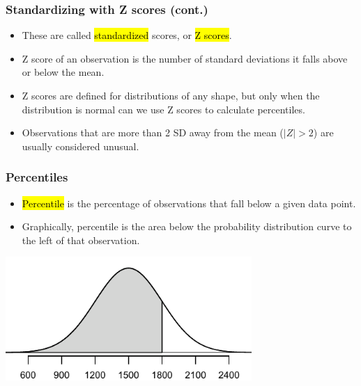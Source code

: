 
\begin{frame}
\frametitle{Standardizing with Z scores (cont.)}

\begin{itemize}

\item These are called \hl{standardized} scores, or \hl{Z scores}.

\item Z score of an observation is the number of standard deviations it falls above or below the mean.
\formula{\[Z = \frac{observation - mean}{SD}\]}

\item Z scores are defined for distributions of any shape, but only when the distribution is normal can we use Z scores to calculate percentiles.

\item Observations that are more than 2 SD away from the mean ($|Z| > 2$) are usually considered unusual.

\end{itemize}

\end{frame}


\begin{frame}
\frametitle{Percentiles}

\begin{itemize}

\item \hl{Percentile} is the percentage of observations that fall below a given data point. 

\item Graphically, percentile is the area below the probability distribution curve to the left of that observation.

\end{itemize}

\begin{center}
\includegraphics[width=0.7\textwidth]{4-1_normal_distribution/figures/satBelow1800/satBelow1800}
\end{center}

\end{frame}

